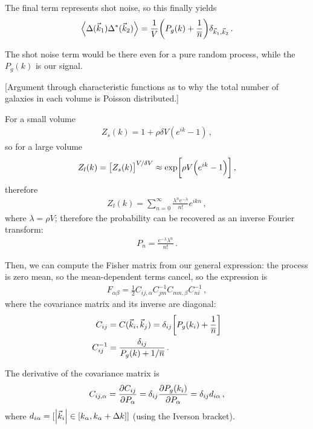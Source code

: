\documentclass[main.tex]{subfiles}
\begin{document}
The final term represents shot noise, so this finally yields 
%
\begin{align}
\expval{ \Delta(\vec{k}_1 ) \Delta^{*} (\vec{k}_2)}
= \frac{1}{V} \qty(P_g (k) + \frac{1}{\overline{n}}) \delta_{\vec{k}_1, \vec{k}_2}
\,.
\end{align}

The shot noise term would be there even for a pure random process, while the \(P_g (k)\) is our signal. 

[Argument through characteristic functions as to why the total number of galaxies in each volume is Poisson distributed.]

For a small volume 
%
\begin{align}
Z_s(k) = 1 + \rho \delta V (e^{ik} - 1)
\,,
\end{align}
%
so for a large volume 
%
\begin{align}
Z_l(k) = \qty[Z_s(k)]^{V / \delta V} \approx \exp[\rho V \qty(e^{ik}- 1)]
\,,
\end{align}
%
therefore 
%
\begin{align}
Z_l(k)  = \sum _{n=0}^{\infty } \frac{\lambda^{n} e^{-\lambda }}{n!} e^{ikn}
\,,
\end{align}
%
where \(\lambda = \rho V\); therefore the probability can be recovered as an inverse Fourier transform:
%
\begin{align}
P_n = \frac{e^{-\lambda } \lambda^{n}}{n!}
\,.
\end{align}

Then, we can compute the Fisher matrix from our general expression: 
the process is zero mean, so the mean-dependent terms cancel, so the expression is 
%
\begin{align}
F_{\alpha \beta } = \frac{1}{2} C_{ij, \alpha } C^{-1}_{jm} C_{mn, \beta } C^{-1}_{ni}
\,,
\end{align}
%
where the covariance matrix and its inverse are diagonal:
%
\begin{align}
C_{ij} &= C(\vec{k}_i, \vec{k}_j) = \delta_{ij} \qty[P_g (k_i) + \frac{1}{\overline{n}}]  \\
C^{-1}_{ij} &= \frac{ \delta_{ij}}{P_g(k) + 1/ \overline{n}}
\,.
\end{align}

The derivative of the covariance matrix is 
%
\begin{align}
C_{ij, \alpha } = \pdv{C_{ij}}{P_\alpha } = \delta_{ij} \pdv{P_g(k_i)}{P_\alpha } = \delta_{ij} d_{i \alpha }
\,,
\end{align}
%
where \(d_{i \alpha } = [\abs{\vec{k}_i} \in [k_\alpha, k_\alpha + \Delta k]]\) (using the Iverson bracket).
\end{document}
